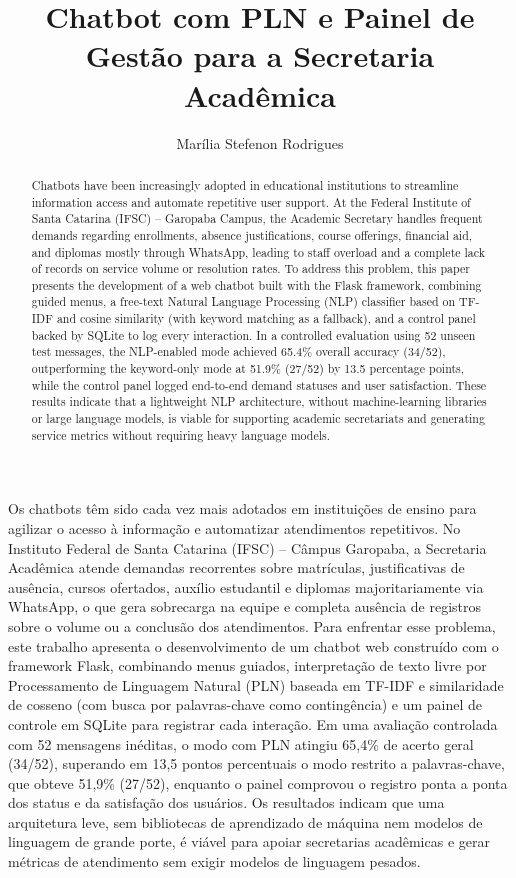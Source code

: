 \documentclass[10pt]{article}
\title{Chatbot com PLN e Painel de Gestão para a Secretaria Acadêmica}
\author{Marília Stefenon Rodrigues\inst{1}}
\begin{document}
\maketitle

\begin{abstract}
Chatbots have been increasingly adopted in educational institutions to streamline information access and automate repetitive user support. At the Federal Institute of Santa Catarina (IFSC) -- Garopaba Campus, the Academic Secretary handles frequent demands regarding enrollments, absence justifications, course offerings, financial aid, and diplomas mostly through WhatsApp, leading to staff overload and a complete lack of records on service volume or resolution rates. To address this problem, this paper presents the development of a web chatbot built with the Flask framework, combining guided menus, a free-text Natural Language Processing (NLP) classifier based on TF-IDF and cosine similarity (with keyword matching as a fallback), and a control panel backed by SQLite to log every interaction. In a controlled evaluation using 52 unseen test messages, the NLP-enabled mode achieved 65.4\% overall accuracy (34/52), outperforming the keyword-only mode at 51.9\% (27/52) by 13.5 percentage points, while the control panel logged end-to-end demand statuses and user satisfaction. These results indicate that a lightweight NLP architecture, without machine-learning libraries or large language models, is viable for supporting academic secretariats and generating service metrics without requiring heavy language models.
\end{abstract}

\begin{resumo}
Os chatbots têm sido cada vez mais adotados em instituições de ensino para agilizar o acesso à informação e automatizar atendimentos repetitivos. No Instituto Federal de Santa Catarina (IFSC) -- Câmpus Garopaba, a Secretaria Acadêmica atende demandas recorrentes sobre matrículas, justificativas de ausência, cursos ofertados, auxílio estudantil e diplomas majoritariamente via WhatsApp, o que gera sobrecarga na equipe e completa ausência de registros sobre o volume ou a conclusão dos atendimentos. Para enfrentar esse problema, este trabalho apresenta o desenvolvimento de um chatbot web construído com o framework Flask, combinando menus guiados, interpretação de texto livre por Processamento de Linguagem Natural (PLN) baseada em TF-IDF e similaridade de cosseno (com busca por palavras-chave como contingência) e um painel de controle em SQLite para registrar cada interação. Em uma avaliação controlada com 52 mensagens inéditas, o modo com PLN atingiu 65,4\% de acerto geral (34/52), superando em 13,5 pontos percentuais o modo restrito a palavras-chave, que obteve 51,9\% (27/52), enquanto o painel comprovou o registro ponta a ponta dos status e da satisfação dos usuários. Os resultados indicam que uma arquitetura leve, sem bibliotecas de aprendizado de máquina nem modelos de linguagem de grande porte, é viável para apoiar secretarias acadêmicas e gerar métricas de atendimento sem exigir modelos de linguagem pesados.
\end{resumo}
\end{document}
